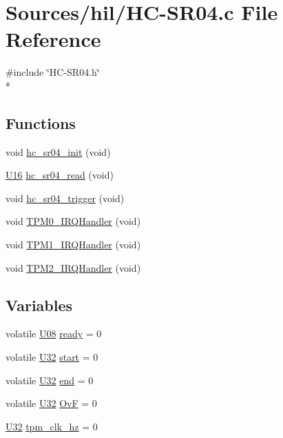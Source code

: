 \hypertarget{_h_c-_s_r04_8c}{}\section{Sources/hil/\+H\+C-\/\+S\+R04.c File Reference}
\label{_h_c-_s_r04_8c}
{\ttfamily \#include \char`\"{}H\+C-\/\+S\+R04.\+h\char`\"{}}\\*
\subsection*{Functions}
\begin{DoxyCompactItemize}
\item 
void \hyperlink{_h_c-_s_r04_8c_aeeb99876e51267cb0eb34b8aeadee08b}{hc\+\_\+sr04\+\_\+init} (void)
\item 
\hyperlink{_types_8h_adf928e51a60dba0df29d615401cc55a8}{U16} \hyperlink{_h_c-_s_r04_8c_a35ee97390c578d1ae3cc173abcbd4ff3}{hc\+\_\+sr04\+\_\+read} (void)
\item 
void \hyperlink{_h_c-_s_r04_8c_aa781766c52781b5d7ca4838019d40dfa}{hc\+\_\+sr04\+\_\+trigger} (void)
\item 
void \hyperlink{_h_c-_s_r04_8c_a346f8023e360ddffd61e34867b30d157}{T\+P\+M0\+\_\+\+I\+R\+Q\+Handler} (void)
\item 
void \hyperlink{_h_c-_s_r04_8c_a83cdb8d63e8beb61594f296426783711}{T\+P\+M1\+\_\+\+I\+R\+Q\+Handler} (void)
\item 
void \hyperlink{_h_c-_s_r04_8c_ab36e33a3eb4d6a9f21aa876c6f0af5b4}{T\+P\+M2\+\_\+\+I\+R\+Q\+Handler} (void)
\end{DoxyCompactItemize}
\subsection*{Variables}
\begin{DoxyCompactItemize}
\item 
volatile \hyperlink{_types_8h_a3fd534ebc238a0e487b81bda78811de6}{U08} \hyperlink{_h_c-_s_r04_8c_ad5ea6fe6d0c4db57abe39c72c5c17b87}{ready} = 0
\item 
volatile \hyperlink{_types_8h_a811024d35b9b8a41095b1f583b649e56}{U32} \hyperlink{_h_c-_s_r04_8c_aafe0cd76d673304e5b435fdef6969662}{start} = 0
\item 
volatile \hyperlink{_types_8h_a811024d35b9b8a41095b1f583b649e56}{U32} \hyperlink{_h_c-_s_r04_8c_a19a318200cf33a699fecac244ede52e8}{end} = 0
\item 
volatile \hyperlink{_types_8h_a811024d35b9b8a41095b1f583b649e56}{U32} \hyperlink{_h_c-_s_r04_8c_aa930652f952c7908d8bb5cec900aa5de}{OvF} = 0
\item 
\hyperlink{_types_8h_a811024d35b9b8a41095b1f583b649e56}{U32} \hyperlink{_h_c-_s_r04_8c_a5d1011673607a4854ece241942a4d686}{tpm\+\_\+clk\+\_\+hz} = 0
\end{DoxyCompactItemize}


